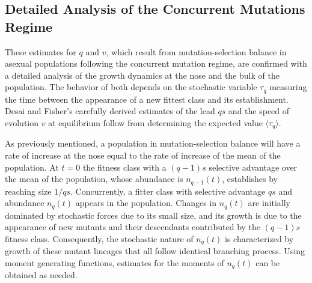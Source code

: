 \documentclass[12pt]{article}
\begin{document}
\subsection*{Detailed Analysis of the Concurrent Mutations Regime}
These estimates for $q$ and $v$, which result from mutation-selection balance in asexual populations following the concurrent mutation regime, are confirmed with a detailed analysis of the growth dynamics at the nose and the bulk of the population.  The behavior of both depends on the stochastic variable $\tau_q$ measuring the time between the appearance of a new fittest class and its establishment.  Desai and Fisher's carefully derived estimates of the lead $qs$ and the speed of evolution $v$ at equilibrium follow from determining the expected value $\langle \tau_q \rangle$.   

As previously mentioned, a population in mutation-selection balance will have a rate of increase at the nose equal to the rate of increase of the mean of the population.  At $t=0$ the fitness class with a $(q-1)s$ selective advantage over the mean of the population, whose abundance is $n_{q-1}(t)$, establishes by reaching size $1/qs$.  Concurrently, a fitter class with selective advantage $qs$ and abundance $n_q(t)$ appears in the population.  Changes in $n_q(t)$ are initially dominated by stochastic forces due to its small size, and its growth is due to the appearance of new mutants and their descendants contributed by the $(q-1)s$ fitness class. Consequently, the stochastic nature of $n_q(t)$ is characterized by growth of these mutant lineages that all follow identical branching process.  Using moment generating functions, estimates for the moments of $n_q(t)$ can be obtained as needed.
\end{document}

